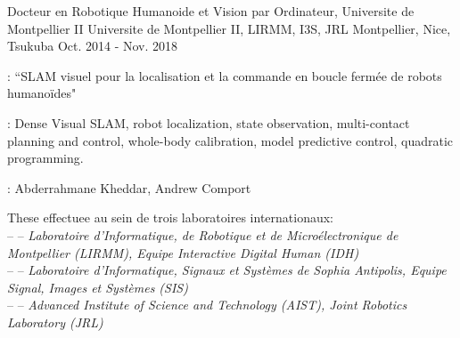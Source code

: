 

\begin{cventries}

  \cventry
    {Docteur en Robotique Humanoide et Vision par Ordinateur, Universite de Montpellier II} %
    {Universite de Montpellier II, LIRMM, I3S, JRL} %
    {Montpellier, Nice, Tsukuba} %
    {Oct. 2014 - Nov. 2018} %
    {
      \begin{cvitems} %
        \item {} : ``SLAM visuel pour la localisation et la commande en boucle fermée de robots humanoïdes"
        \item {}: Dense Visual SLAM, robot localization, state observation, multi-contact planning and control, whole-body calibration, model predictive control, quadratic programming.
        \item {}: Abderrahmane Kheddar, Andrew Comport 
        \item These effectuee au sein de trois laboratoires internationaux:\\
        --  -- \emph{Laboratoire d'Informatique, de Robotique et de Microélectronique de Montpellier (LIRMM), Equipe Interactive Digital Human (IDH)}\\
          --  -- \emph{Laboratoire d'Informatique, Signaux et Systèmes de Sophia Antipolis, Equipe Signal, Images et Systèmes (SIS)}\\
          --  -- \emph{Advanced Institute of Science and Technology (AIST), Joint Robotics Laboratory (JRL)}
      \end{cvitems}
    }


\end{cventries}
